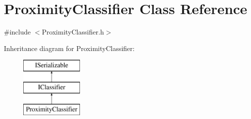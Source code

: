 \hypertarget{class_proximity_classifier}{}\section{Proximity\+Classifier Class Reference}
\label{class_proximity_classifier}


{\ttfamily \#include $<$Proximity\+Classifier.\+h$>$}

Inheritance diagram for Proximity\+Classifier\+:\begin{figure}[H]
\begin{center}
\leavevmode
\includegraphics[height=3.000000cm]{class_proximity_classifier}
\end{center}
\end{figure}
